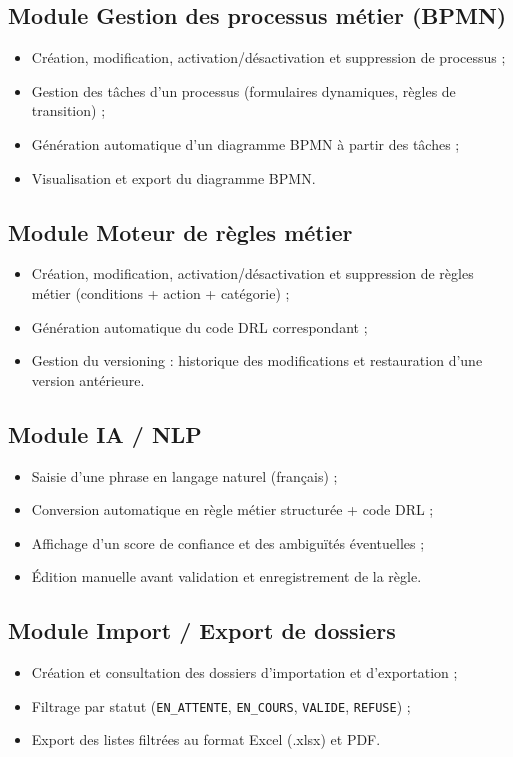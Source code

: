 \subsection{Module Gestion des processus m\'etier (BPMN)}
\begin{itemize}
    \item Cr\'eation, modification, activation/d\'esactivation et
    suppression de processus ;
    \item Gestion des t\^aches d'un processus (formulaires dynamiques,
    r\`egles de transition) ;
    \item G\'en\'eration automatique d'un diagramme BPMN \`a partir des
    t\^aches ;
    \item Visualisation et export du diagramme BPMN.
\end{itemize}

\subsection{Module Moteur de r\`egles m\'etier}
\begin{itemize}
    \item Cr\'eation, modification, activation/d\'esactivation et
    suppression de r\`egles m\'etier (conditions + action + cat\'egorie) ;
    \item G\'en\'eration automatique du code DRL correspondant ;
    \item Gestion du versioning : historique des modifications et
    restauration d'une version ant\'erieure.
\end{itemize}

\subsection{Module IA / NLP}
\begin{itemize}
    \item Saisie d'une phrase en langage naturel (fran\c{c}ais) ;
    \item Conversion automatique en r\`egle m\'etier structur\'ee + code DRL ;
    \item Affichage d'un score de confiance et des ambigu\"it\'es
    \'eventuelles ;
    \item \'Edition manuelle avant validation et enregistrement de la
    r\`egle.
\end{itemize}

\subsection{Module Import / Export de dossiers}
\begin{itemize}
    \item Cr\'eation et consultation des dossiers d'importation et
    d'exportation ;
    \item Filtrage par statut (\texttt{EN\_ATTENTE}, \texttt{EN\_COURS},
    \texttt{VALIDE}, \texttt{REFUSE}) ;
    \item Export des listes filtr\'ees au format Excel (.xlsx) et PDF.
\end{itemize}

